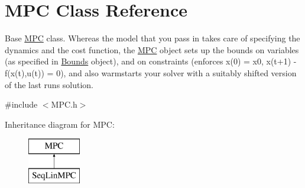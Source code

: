 \hypertarget{classMPC}{}\section{M\+PC Class Reference}
\label{classMPC}


Base \mbox{\hyperlink{classMPC}{M\+PC}} class. Whereas the model that you pass in takes care of specifying the dynamics and the cost function, the \mbox{\hyperlink{classMPC}{M\+PC}} object sets up the bounds on variables (as specified in \mbox{\hyperlink{structBounds}{Bounds}} object), and on constraints (enforces x(0) = x0, x(t+1) -\/ f(x(t),u(t)) = 0), and also warmstarts your solver with a suitably shifted version of the last run\textquotesingle{}s solution.  




{\ttfamily \#include $<$M\+P\+C.\+h$>$}

Inheritance diagram for M\+PC\+:\begin{figure}[H]
\begin{center}
\leavevmode
\includegraphics[height=2.000000cm]{classMPC}
\end{center}
\end{figure}
